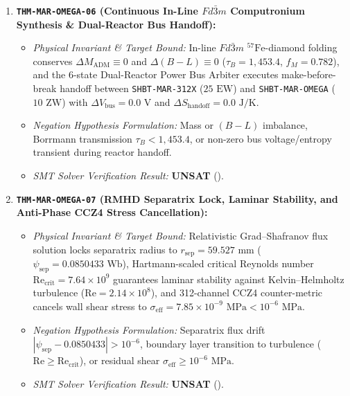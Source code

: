 \documentclass[11pt,onecolumn]{article}
\begin{document}
\begin{enumerate}
    \item \textbf{\texttt{THM-MAR-OMEGA-06} (Continuous In-Line $Fd\bar{3}m$ Computronium Synthesis \& Dual-Reactor Bus Handoff):}
    \begin{itemize}
        \item \emph{Physical Invariant \& Target Bound:} In-line $Fd\bar{3}m$ $^{57}\text{Fe}$-diamond folding conserves $\Delta M_{\text{ADM}} \equiv 0$ and $\Delta(B-L) \equiv 0$ ($\tau_B = 1{,}453.4$, $f_M = 0.782$), and the 6-state Dual-Reactor Power Bus Arbiter executes make-before-break handoff between \texttt{SHBT-MAR-312X} ($25\text{ EW}$) and \texttt{SHBT-MAR-OMEGA} ($10\text{ ZW}$) with $\Delta V_{\text{bus}} = 0.0\text{ V}$ and $\Delta S_{\text{handoff}} = 0.0\text{ J/K}$.
        \item \emph{Negation Hypothesis Formulation:} Mass or $(B-L)$ imbalance, Borrmann transmission $\tau_B < 1{,}453.4$, or non-zero bus voltage/entropy transient during reactor handoff.
        \item \emph{SMT Solver Verification Result:} \textbf{UNSAT} ().
    \end{itemize}

    \item \textbf{\texttt{THM-MAR-OMEGA-07} (RMHD Separatrix Lock, Laminar Stability, and Anti-Phase CCZ4 Stress Cancellation):}
    \begin{itemize}
        \item \emph{Physical Invariant \& Target Bound:} Relativistic Grad--Shafranov flux solution locks separatrix radius to $r_{\text{sep}} = 59.527\text{ mm}$ ($\psi_{\text{sep}} = 0.0850433\text{ Wb}$), Hartmann-scaled critical Reynolds number $\mathrm{Re}_{\text{crit}} = 7.64 \times 10^9$ guarantees laminar stability against Kelvin--Helmholtz turbulence ($\mathrm{Re} = 2.14 \times 10^8$), and 312-channel CCZ4 counter-metric cancels wall shear stress to $\sigma_{\text{eff}} = 7.85 \times 10^{-9}\text{ MPa} < 10^{-6}\text{ MPa}$.
        \item \emph{Negation Hypothesis Formulation:} Separatrix flux drift $|\psi_{\text{sep}} - 0.0850433| > 10^{-6}$, boundary layer transition to turbulence ($\mathrm{Re} \ge \mathrm{Re}_{\text{crit}}$), or residual shear $\sigma_{\text{eff}} \ge 10^{-6}\text{ MPa}$.
        \item \emph{SMT Solver Verification Result:} \textbf{UNSAT} ().
    \end{itemize}


\end{enumerate}
\end{document}
